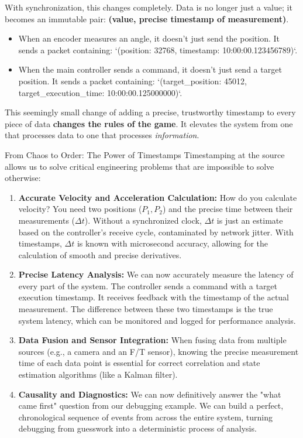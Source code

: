 With synchronization, this changes completely. Data is no longer just a value; it becomes an immutable pair: \textbf{(value, precise timestamp of measurement)}.
\begin{itemize}
    \item When an encoder measures an angle, it doesn't just send the position. It sends a packet containing: `(position: 32768, timestamp: 10:00:00.123456789)`.
    \item When the main controller sends a command, it doesn't just send a target position. It sends a packet containing: `(target\_position: 45012, target\_execution\_time: 10:00:00.125000000)`.
\end{itemize}

This seemingly small change of adding a precise, trustworthy timestamp to every piece of data \textbf{changes the rules of the game}. It elevates the system from one that processes data to one that processes \textit{information}.

\begin{principlebox}{From Chaos to Order: The Power of Timestamps}
    Timestamping at the source allows us to solve critical engineering problems that are impossible to solve otherwise:
    \begin{enumerate}
        \item \textbf{Accurate Velocity and Acceleration Calculation:} How do you calculate velocity? You need two positions ($P_1, P_2$) and the precise time between their measurements ($\Delta t$). Without a synchronized clock, $\Delta t$ is just an estimate based on the controller's receive cycle, contaminated by network jitter. With timestamps, $\Delta t$ is known with microsecond accuracy, allowing for the calculation of smooth and precise derivatives.
        
        \item \textbf{Precise Latency Analysis:} We can now accurately measure the latency of every part of the system. The controller sends a command with a target execution timestamp. It receives feedback with the timestamp of the actual measurement. The difference between these two timestamps is the true system latency, which can be monitored and logged for performance analysis.
        
        \item \textbf{Data Fusion and Sensor Integration:} When fusing data from multiple sources (e.g., a camera and an F/T sensor), knowing the precise measurement time of each data point is essential for correct correlation and state estimation algorithms (like a Kalman filter).
        
        \item \textbf{Causality and Diagnostics:} We can now definitively answer the "what came first" question from our debugging example. We can build a perfect, chronological sequence of events from across the entire system, turning debugging from guesswork into a deterministic process of analysis.
    \end{enumerate}
\end{principlebox}


